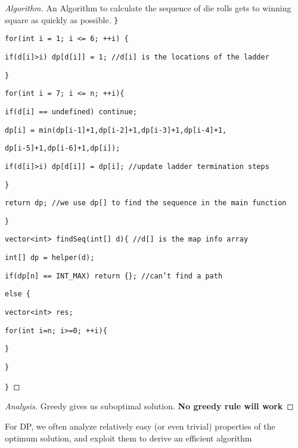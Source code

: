 \documentclass[openany]{article}
\begin{document}
\begin{proof}[Algorithm]{}{An Algorithm to calculate the sequence of die rolls gets to winning square as quickly as possible.}
    \qquad \texttt{\}}

    \qquad \texttt{for(int i = 1; i <= 6; ++i) \{}

    \qquad \qquad \texttt{if(d[i]>i) dp[d[i]] = 1; //d[i] is the locations of the ladder}

    \qquad \texttt{\}}
    
    \qquad \texttt{for(int i = 7; i <= n; ++i)\{}
 
    \qquad \qquad \texttt{if(d[i] == undefined) continue;}

    
    \qquad \qquad \texttt{dp[i] = min(dp[i-1]+1,dp[i-2]+1,dp[i-3]+1,dp[i-4]+1,}
    
    \qquad \qquad \qquad \qquad \texttt{dp[i-5]+1,dp[i-6]+1,dp[i]);}

    \qquad \qquad \texttt{if(d[i]>i) dp[d[i]] = dp[i]; //update ladder termination steps}
    
    \qquad \texttt{\}}

    \qquad \texttt{return dp; //we use dp[] to find the sequence in the main function}

    \texttt{\}}

    \texttt{vector<int> findSeq(int[] d)\{ //d[] is the map info array}

    \qquad \texttt{int[] dp = helper(d);}

    \qquad \texttt{if(dp[n] == INT\_MAX) return \{\}; //can't find a path}

    \qquad \texttt{else \{}

    \qquad \texttt{vector<int> res;}

    \qquad \qquad \texttt{for(int i=n; i>=0; ++i)\{}

    \qquad \qquad \texttt{}

    \qquad \qquad \texttt{\}}
    
    \qquad \texttt{\}}

    \texttt{\}}
\end{proof}




\begin{proof}[Analysis]{}
		\renewcommand{\qedsymbol}{} %
        Greedy gives us suboptimal solution. \textbf{No greedy rule will work}
\end{proof}

\begin{theorem*}{}
    For DP, we often analyze relatively easy (or even trivial) properties of the optimum solution, and exploit them to derive an efficient algorithm
\end{theorem*}
\end{document}
